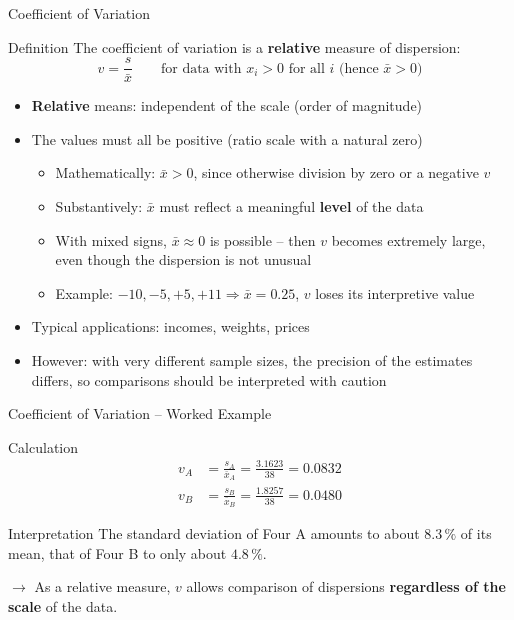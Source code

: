 \documentclass[aspectratio=169,11pt]{beamer}
\begin{document}
\begin{frame}{Coefficient of Variation}
  \begin{block}{Definition}
    The coefficient of variation is a \textbf{relative} measure of dispersion:
    \[ v = \frac{s}{\bar{x}} \qquad \text{for data with } x_i > 0 \text{ for all } i \text{ (hence } \bar{x} > 0) \]
  \end{block}

  \begin{itemize}
    \item \textbf{Relative} means: independent of the scale (order of magnitude)
    \item The values must all be positive (ratio scale with a natural zero)
      \begin{itemize}
        \item Mathematically: $\bar{x} > 0$, since otherwise division by zero or a negative $v$
        \item Substantively: $\bar{x}$ must reflect a meaningful \textbf{level} of the data
        \item With mixed signs, $\bar{x} \approx 0$ is possible -- then $v$ becomes extremely large, even though the dispersion is not unusual
        \item Example: $-10, -5, +5, +11 \Rightarrow \bar{x} = 0.25$, $v$ loses its interpretive value
      \end{itemize}
    \item Typical applications: incomes, weights, prices
    \item However: with very different sample sizes, the precision of the estimates differs, so comparisons should be interpreted with caution
  \end{itemize}
\end{frame}


\begin{frame}{Coefficient of Variation -- Worked Example}

  \begin{exampleblock}{Calculation}
    \begin{align*}
      v_A &= \frac{s_A}{\bar{x}_A} = \frac{3.1623}{38} = 0.0832 \\[4pt]
      v_B &= \frac{s_B}{\bar{x}_B} = \frac{1.8257}{38} = 0.0480
    \end{align*}
  \end{exampleblock}

  \vspace{0.2cm}

  \begin{alertblock}{Interpretation}
    The standard deviation of Four A amounts to about $8.3\,\%$ of its mean, that of Four B
    to only about $4.8\,\%$.

    $\to$ As a relative measure, $v$ allows comparison of dispersions \textbf{regardless of the scale} of the data.
  \end{alertblock}
\end{frame}
\end{document}
